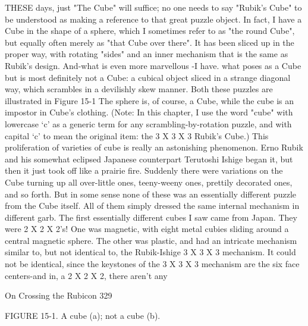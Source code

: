THESE days, just "The Cube" will suffice; no one needs to say "Rubik's Cube" to
be understood as making a reference to that great puzzle object. In fact, I have a Cube
in the shape of a sphere, which I sometimes refer to as "the round Cube", but equally
often merely as "that Cube over there". It has been sliced up in the proper way, with
rotating "sides" and an inner mechanism that is the same as Rubik's design. And-what
is even more marvellous -I have. what poses as a Cube but is most definitely not a
Cube: a cubical object sliced in a strange diagonal way, which scrambles in a
devilishly skew manner. Both these puzzles are illustrated in Figure 15-1 The sphere
is, of course, a Cube, while the cube is an impostor in Cube's clothing. (Note: In this
chapter, I use the word "cube" with lowercase `c' as a generic term for any
scrambling-by-rotation puzzle, and with capital `c' to mean the original item: the 3 X
3 X 3 Rubik's Cube.)
        This proliferation of varieties of cube is really an astonishing phenomenon.
Erno Rubik and his somewhat eclipsed Japanese counterpart Terutoshi Ishige began
it, but then it just took off like a prairie fire. Suddenly there were variations on the
Cube turning up all over-little ones, teeny-weeny ones, prettily decorated ones, and so
forth. But in some sense none of these was an essentially different puzzle from the
Cube itself. All of them simply dressed the same internal mechanism in different garb.
The first essentially different cubes I saw came from Japan. They were 2 X 2 X 2's!
One was magnetic, with eight metal cubies sliding around a central magnetic sphere.
The other was plastic, and had an intricate mechanism similar to, but not identical to,
the Rubik-Ishige 3 X 3 X 3 mechanism. It could not be identical, since the keystones
of the 3 X 3 X 3 mechanism are the six face centers-and in, a 2 X 2 X 2, there aren't
any




On Crossing the Rubicon                                                             329

FIGURE 15-1. A cube (a); not a cube (b).

